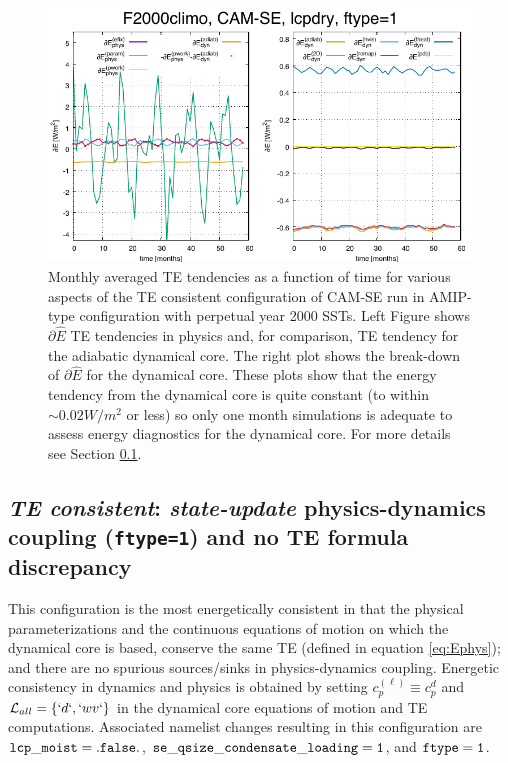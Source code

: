 \documentclass{agujournal}
\newcommand*{\gi}[1]{\widehat{#1}}
\begin{document}
 \begin{figure}[h]
 \centering
 \includegraphics[width=35pc]{figs/dEdt.pdf}
 \caption{Monthly averaged TE tendencies as a function of time for various aspects of the TE consistent configuration of CAM-SE run in AMIP-type configuration with perpetual year 2000 SSTs. Left Figure shows $\partial \gi{E}$ TE tendencies in physics and, for comparison, TE tendency for the adiabatic dynamical core. The right plot shows the break-down of $\partial \gi{E}$ for the dynamical core. These plots show that the energy tendency from the dynamical core is quite constant (to within $\sim 0.02W/m^2$ or less) so only one month simulations is adequate to assess energy diagnostics for the dynamical core. For more details see Section \ref{sec:consistent}.}
 \label{fig:dEdt(t)}
  \end{figure}




\subsection{{\em{TE consistent}}: {\em{state-update}} physics-dynamics coupling ({\tt{ftype=1}}) and no TE formula discrepancy}
\label{sec:consistent}
This configuration is the most energetically consistent in that the physical parameterizations and the continuous equations of motion on which the dynamical core is based, conserve the same TE (defined in equation \eqref{eq:Ephys}); and there are no spurious sources/sinks in physics-dynamics coupling. Energetic consistency in dynamics and physics is obtained by setting $c_p^{(\ell)}\equiv c_p^{d}$ and $\mathcal{L}_{all}=\left\{ `d`,`wv`\right\}$ in the dynamical core equations of motion and TE computations. Associated namelist changes resulting in this configuration are $\tt{lcp\_moist=.false.}$, $\tt{se\_qsize\_condensate\_loading=1}$, and $\tt{ftype=1}$. 
\end{document}
